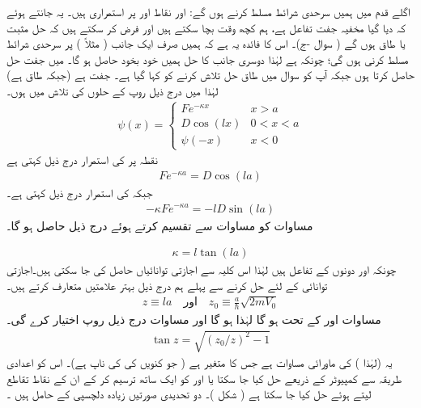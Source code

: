  اگلے قدم میں ہمیں سرحدی شرائط مسلط کرنے ہوں گے: اور  نقاط  اور پر استمراری ہیں۔ یہ جانتے ہوئے کہ دیا گیا مخفیہ جفت تفاعل ہے، ہم کچھ وقت بچا سکتے ہیں اور فرض کر سکتے ہیں کہ حل مثبت یا طاق ہوں گے ( سوال -ج)۔ اس کا فائدہ یہ ہے کہ ہمیں صرف ایک جانب ( مثلاً ) پر سرحدی شرائط مسلط کرنی ہوں گی؛ چونکہ ہے لہٰذا دوسری جانب کا حل ہمیں خود بخود حاصل ہو گا۔ میں جفت حل حاصل کرتا ہوں جبکہ آپ کو سوال  میں طاق حل تلاش کرنے کو کہا گیا ہے۔ جفت ہے (جبکہ طاق ہے) لہٰذا میں درج ذیل روپ کے حلوں کی تلاش میں ہوں۔ 
\begin{align}\label{مساوات_شروڈنگر_تلاش_تفاعلات}
\psi(x)=
\begin{cases}
Fe^{-\kappa x} & x> a\\
D\cos(l x) & 0< x < a\\
\psi(-x) & x< 0
\end{cases}
\end{align}
نقطہ پر  کی استمرار درج ذیل کہتی ہے 
\begin{align}\label{مساوات_شروڈنگر_استمرار_مستقل_الف}
 Fe^{-\kappa a}=D\cos(la) 
 \end{align}
 جبکہ  کی استمرار درج ذیل کہتی ہے۔
 \begin{align}\label{مساوات_شروڈنگر_استمرار_مستقل_ب}
 -\kappa Fe^{-\kappa a}=-lD\sin(la) 
 \end{align} 
 مساوات  کو مساوات  سے تقسیم کرتے ہوئے درج ذیل حاصل ہو گا۔

\begin{align}\label{مساوات_شروڈنگر_حل_کپا}
\kappa =l\tan(la) 
 \end{align}
 چونکہ  اور  دونوں  کے تفاعل ہیں لہٰذا اس کلیہ سے اجازتی توانائیاں حاصل کی جا سکتی ہیں۔اجازتی توانائی کے لئے حل کرنے سے پہلے ہم درج ذیل بہتر علامتیں متعارف کرتے ہیں۔
\begin{align}
z\equiv l a \quad \text{اور}\quad z_0\equiv\frac{a}{\hslash}\sqrt{2mV_0}
\end{align} 
مساوات  اور  کے تحت  ہو گا لہٰذا  ہو گا اور مساوات  درج ذیل روپ اختیار کرے گی۔
\begin{align}\label{مساوات_غیر_تابع_شروڈنگر_ترسیمی_حل}
\tan z=\sqrt{(z_{0}/z)^{2}-1} 
\end{align}
 یہ  (لہٰذا ) کی ماورائی مساوات ہے جس کا متغیر  ہے ( جو کنویں  کی کی ناپ ہے)۔ اس کو اعدادی طریقہ سے کمپیوٹر کے ذریعے حل کیا جا سکتا یا  اور  کو ایک ساتھ ترسیم کر کے ان کے نقاط تقاطع لیتے ہوئے حل کیا جا سکتا ہے ( شکل )۔ دو تحدیدی صورتیں زیادہ دلچسپی کے حامل ہیں ۔ 
 
